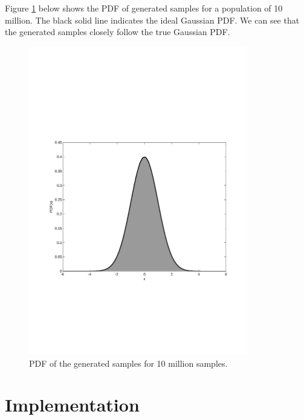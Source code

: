 \documentclass[a4paper, titlepage]{article}
\begin{document}
Figure \ref{fig:pdfplot} below shows the PDF of generated samples for
a population of 10 million.
The black solid line indicates the ideal Gaussian PDF.
We can see that the generated samples closely follow the true Gaussian PDF.
\begin{figure}[!htbp]
\centering
\includegraphics[width=0.85\textwidth]{pdfplot.pdf}
\caption{PDF of the generated samples for 10 million samples.}
\label{fig:pdfplot}
\end{figure}


\section{Implementation}
\end{document}

